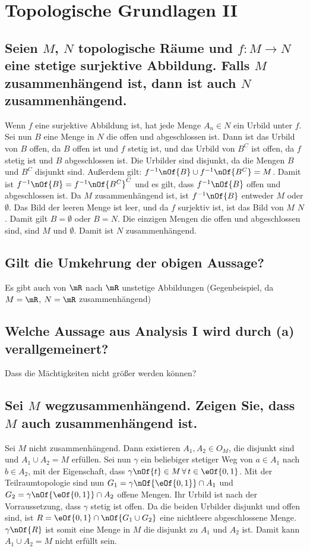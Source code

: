 \section{Topologische Grundlagen II}
\subsection{Seien $M$, $N$ topologische Räume und $f:M\to N$ eine stetige surjektive Abbildung. Falls $M$ zusammenhängend ist, dann ist auch $N$ zusammenhängend.}
Wenn $f$ eine surjektive Abbildung ist, hat jede Menge $A_n \in N$ ein Urbild unter $f$. Sei nun $B$ eine Menge in $N$ die offen und abgeschlossen ist. Dann ist das Urbild von $B$ offen, da $B$ offen ist und $f$ stetig ist, und das Urbild von $B^C$ ist offen, da $f$ stetig ist und $B$ abgeschlossen ist. Die Urbilder sind disjunkt, da die Mengen $B$ und $B^C$ disjunkt sind. Außerdem gilt: $f^{-1}\nOf{B} \cup f^{-1}\nOf{B^C} = M$. Damit ist $f^{-1}\nOf{B} = f^{-1}\nOf{B^C}^C$ und es gilt, dass $f^{-1}\nOf{B}$ offen und abgeschlossen ist. Da $M$ zusammenhängend ist, ist $f^{-1}\nOf{B}$ entweder $M$ oder $\emptyset$. Das Bild der leeren Menge ist leer, und da $f$ surjektiv ist, ist das Bild von $M$ $N$. Damit gilt $B=\emptyset$ oder $B = N$. Die einzigen Mengen die offen und abgeschlossen sind, sind $M$ und $\emptyset$. Damit ist $N$ zusammenhängend.


\subsection{Gilt die Umkehrung der obigen Aussage?}
Es gibt auch von $\mR$ nach $\mR$ unstetige Abbildungen (Gegenbeispiel, da $M=\mR$, $N=\mR$ zusammenhängend)

\subsection{Welche Aussage aus Analysis I wird durch (a) verallgemeinert?}
Dass die Mächtigkeiten nicht größer werden können?


\subsection{Sei $M$ wegzusammenhängend. Zeigen Sie, dass $M$ auch zusammenhängend ist.} 
Sei $M$ nicht zusammenhängend.
Dann existieren $A_1, A_2 \in O_M$, die disjunkt sind und $A_1\cup A_2 = M$ erfüllen. Sei nun $\gamma$ ein beliebiger stetiger Weg von $a\in A_1$ nach $b\in A_2$, mit der Eigenschaft, dass $\gamma\nOf{t} \in M \,\forall\, t\in \eOf{0,1}$. Mit der Teilraumtopologie sind nun $G_1 = \gamma\nOf{\eOf{0,1}}\cap A_1$ und $G_2 = \gamma\nOf{\eOf{0,1}}\cap A_2$ offene Mengen. Ihr Urbild ist nach der Vorraussetzung, dass $\gamma$ stetig ist offen. Da die beiden Urbilder disjunkt und offen sind, ist $R = \eOf{0,1}\cap\nOf{G_1\cup G_2}$ eine nichtleere abgeschlossene Menge. $\gamma\nOf{R}$ ist somit eine Menge in $M$ die disjunkt zu $A_1$ und $A_2$ ist. Damit kann $A_1\cup A_2 = M$ nicht erfüllt sein.